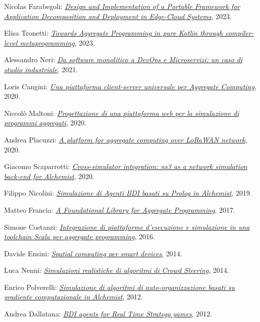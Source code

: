 \begin{innerlist}
    \item Nicolas Farabegoli: \href{https://amslaurea.unibo.it/28035/}{\textit{Design and Implementation of a Portable Framework for Application Decomposition and Deployment in Edge-Cloud Systems}}, 2023.
    \item Elisa Tronetti: \href{https://amslaurea.unibo.it/28077/}{\textit{Towards Aggregate Programming in pure Kotlin through compiler-level metaprogramming}}, 2023.
    \item Alessandro Neri: \href{http://amslaurea.unibo.it/23043/}{\textit{Da software monolitico a DevOps e Microservizi: un caso di studio industriale}}, 2021.
    \item Loris Cangini: \href{http://amslaurea.unibo.it/20410/}{\textit{Una piattaforma client-server universale per Aggregate Computing}}, 2020.
    \item Niccolò Maltoni: \href{http://amslaurea.unibo.it/20478/}{\textit{Progettazione di una piattaforma web per la simulazione di programmi aggregati}}, 2020.
    \item Andrea Placuzzi: \href{http://amslaurea.unibo.it/20484/}{\textit{A platform for aggregate computing over LoRaWAN network}}, 2020.
    \item Giacomo Scaparrotti: \href{http://amslaurea.unibo.it/20440/}{\textit{Cross-simulator integration: ns3 as a network simulation back-end for Alchemist}}, 2020.
    \item Filippo Nicolini: \href{http://amslaurea.unibo.it/19521/}{\textit{Simulazione di Agenti BDI basati su Prolog in Alchemist}}, 2019.
    \item Matteo Francia: \href{http://amslaurea.unibo.it/13090/}{\textit{A Foundational Library for Aggregate Programming}}, 2017.
    \item Simone Costanzi: \href{http://amslaurea.unibo.it/10519/}{\textit{Integrazione di piattaforme d'esecuzione e simulazione in una toolchain Scala per aggregate programming}}, 2016.
    \item Davide Ensini: \href{http://amslaurea.unibo.it/7990/}{\textit{Spatial computing per smart devices}}, 2014.
    \item Luca Nenni: \href{http://amslaurea.unibo.it/6927/}{\textit{Simulazioni realistiche di algoritmi di Crowd Steering}}, 2014.
    \item Enrico Polverelli: \href{http://amslaurea.unibo.it/5293/}{\textit{Simulazione di algoritmi di auto-organizzazione basati su gradiente computazionale in Alchemist}}, 2012.
    \item Andrea Dallatana: \href{http://amslaurea.unibo.it/4217/}{\textit{BDI agents for Real Time Strategy games}}, 2012.

\end{innerlist}
